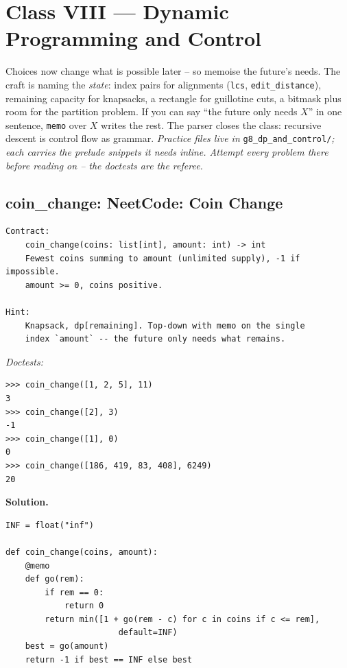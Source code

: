 \documentclass[11pt,letterpaper]{book}
\begin{document}
\chapter{Class VIII --- Dynamic Programming and Control}

Choices now change what is possible later -- so memoise the future's needs.
The craft is naming the \emph{state}: index pairs for alignments
(\texttt{lcs}, \texttt{edit\_distance}), remaining capacity for knapsacks, a
rectangle for guillotine cuts, a bitmask plus room for the partition problem.
If you can say ``the future only needs $X$'' in one sentence, \texttt{memo}
over $X$ writes the rest. The parser closes the class: recursive descent
is control flow as grammar.
\medskip\noindent\textit{Practice files live in }\texttt{g8\_dp\_and\_control/}\textit{;
each carries the prelude snippets it needs inline. Attempt every problem there
before reading on -- the doctests are the referee.}

\section{coin\_change: NeetCode: Coin Change}
\begin{lstlisting}[style=spec]
Contract:
    coin_change(coins: list[int], amount: int) -> int
    Fewest coins summing to amount (unlimited supply), -1 if impossible.
    amount >= 0, coins positive.

Hint:
    Knapsack, dp[remaining]. Top-down with memo on the single
    index `amount` -- the future only needs what remains.
\end{lstlisting}
\noindent\textit{Doctests:}
\begin{lstlisting}[style=spec]
>>> coin_change([1, 2, 5], 11)
3
>>> coin_change([2], 3)
-1
>>> coin_change([1], 0)
0
>>> coin_change([186, 419, 83, 408], 6249)
20
\end{lstlisting}
\noindent\textbf{Solution.}
\begin{lstlisting}[style=code]
INF = float("inf")

def coin_change(coins, amount):
    @memo
    def go(rem):
        if rem == 0:
            return 0
        return min([1 + go(rem - c) for c in coins if c <= rem],
                       default=INF)
    best = go(amount)
    return -1 if best == INF else best
\end{lstlisting}
\end{document}
